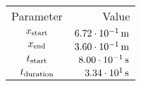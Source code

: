 \begin{tabular}{cr}
    \toprule
    Parameter & Value \\ \otoprule
    $x_{\textup{start}}$    & $\unit[6.72 \cdot 10^{-1}]{m}$ \\
    $x_{\textup{end}}$      & $\unit[3.60 \cdot 10^{-1}]{m}$ \\
    $t_{\textup{start}}$    & $\unit[8.00 \cdot 10^{-1}]{s}$ \\
    $t_{\textup{duration}}$ & $\unit[3.34 \cdot 10^{1}]{s}$ \\
    \bottomrule
\end{tabular}
